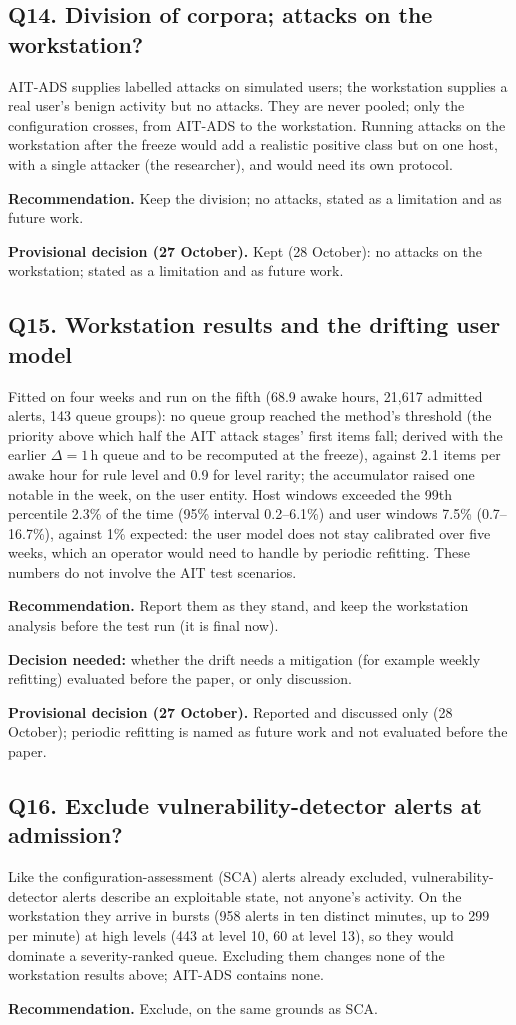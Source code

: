 \documentclass[10.5pt,a4paper]{article}
\newcommand{\rec}[1]{\par\smallskip\noindent\colorbox{gray!12}{\parbox{\dimexpr\linewidth-2\fboxsep}{\textbf{Recommendation.} #1}}\par\smallskip}
\newcommand{\ask}[1]{\par\noindent\textbf{Decision needed:} #1\par\medskip}
\newcommand{\dec}[1]{\par\smallskip\noindent\colorbox{blue!8}{\parbox{\dimexpr\linewidth-2\fboxsep}{\textbf{Provisional decision (27 October).} #1}}\par\medskip}
\begin{document}
\subsection*{Q14. Division of corpora; attacks on the workstation?}
AIT-ADS supplies labelled attacks on simulated users; the workstation supplies a real user's benign activity but no attacks. They are never pooled; only the configuration crosses, from AIT-ADS to the workstation. Running attacks on the workstation after the freeze would add a realistic positive class but on one host, with a single attacker (the researcher), and would need its own protocol.
\rec{Keep the division; no attacks, stated as a limitation and as future work.}

\dec{Kept (28 October): no attacks on the workstation; stated as a limitation and as future work.}

\subsection*{Q15. Workstation results and the drifting user model}
Fitted on four weeks and run on the fifth (68.9 awake hours, 21{,}617 admitted alerts, 143 queue groups): no queue group reached the method's threshold (the priority above which half the AIT attack stages' first items fall; derived with the earlier $\Delta = 1$\,h queue and to be recomputed at the freeze), against 2.1 items per awake hour for rule level and 0.9 for level rarity; the accumulator raised one notable in the week, on the user entity. Host windows exceeded the 99th percentile 2.3\% of the time (95\% interval 0.2--6.1\%) and user windows 7.5\% (0.7--16.7\%), against 1\% expected: the user model does not stay calibrated over five weeks, which an operator would need to handle by periodic refitting. These numbers do not involve the AIT test scenarios.
\rec{Report them as they stand, and keep the workstation analysis before the test run (it is final now).}
\ask{whether the drift needs a mitigation (for example weekly refitting) evaluated before the paper, or only discussion.}

\dec{Reported and discussed only (28 October); periodic refitting is named as future work and not evaluated before the paper.}

\subsection*{Q16. Exclude vulnerability-detector alerts at admission?}
Like the configuration-assessment (SCA) alerts already excluded, vulnerability-detector alerts describe an exploitable state, not anyone's activity. On the workstation they arrive in bursts (958 alerts in ten distinct minutes, up to 299 per minute) at high levels (443 at level 10, 60 at level 13), so they would dominate a severity-ranked queue. Excluding them changes none of the workstation results above; AIT-ADS contains none.
\rec{Exclude, on the same grounds as SCA.}
\end{document}
